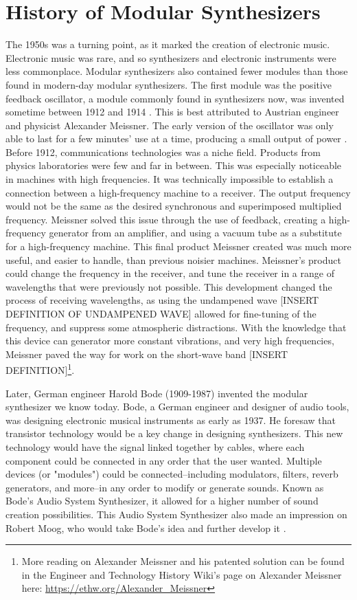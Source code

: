 \section[History of Modular Synthesizers]{History of Modular Synthesizers}\label{mod-synth-history}

The 1950s was a turning point, as it marked the creation of electronic music. Electronic music was rare, and so synthesizers and electronic instruments were less commonplace. Modular synthesizers also contained fewer modules than those found in modern-day modular synthesizers. The first module was the positive feedback oscillator, a module commonly found in synthesizers now, was invented sometime between 1912 and 1914 \cite{Gabrielli_2020}. This is best attributed to Austrian engineer and physicist Alexander Meissner. The early version of the oscillator was only able to last for a few minutes' use at a time, producing a small output of power \cite{Fleming_1919}. Before 1912, communications technologies was a niche field. Products from physics laboratories were few and far in between. This was especially noticeable in machines with high frequencies. It was technically impossible to establish a connection between a high-frequency machine to a receiver. The output frequency would not be the same as the desired synchronous and superimposed multiplied frequency. Meissner solved this issue through the use of feedback, creating a high-frequency generator from an amplifier, and using a vacuum tube as a substitute for a high-frequency machine. This final product Meissner created was much more useful, and easier to handle, than previous noisier machines. Meissner's product could change the frequency in the receiver, and tune the receiver in a range of wavelengths that were previously not possible. This development changed the process of receiving wavelengths, as using the undampened wave [INSERT DEFINITION OF UNDAMPENED WAVE] allowed for fine-tuning of the frequency, and suppress some atmospheric distractions. With the knowledge that this device can generator more constant vibrations, and very high frequencies, Meissner paved the way for work on the short-wave band [INSERT DEFINITION]\footnote{More reading on Alexander Meissner and his patented solution can be found in the Engineer and Technology History Wiki's page on Alexander Meissner here: \url{https://ethw.org/Alexander_Meissner}}.

Later, German engineer Harold Bode (1909-1987) invented the modular synthesizer we know today. Bode, a German engineer and designer of audio tools, was designing electronic musical instruments as early as 1937. He foresaw that transistor technology would be a key change in designing synthesizers. This new technology would have the signal linked together by cables, where each component could be connected in any order that the user wanted. Multiple devices (or "modules") could be connected--including modulators, filters, reverb generators, and more--in any order to modify or generate sounds. Known as Bode's Audio System Synthesizer, it allowed for a higher number of sound creation possibilities. This Audio System Synthesizer also made an impression on Robert Moog, who would take Bode's idea and further develop it \cite{Gabrielli_2020}. 

